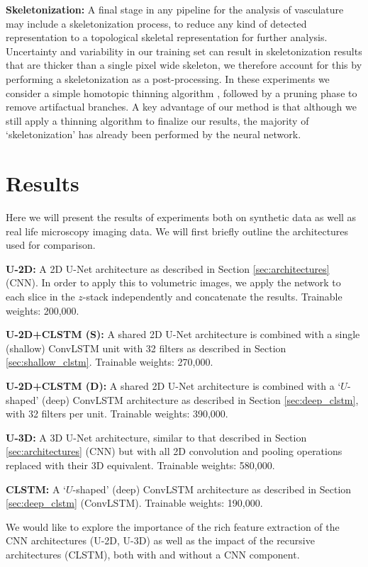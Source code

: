 \documentclass[journal,transmag]{IEEEtran}
\begin{document}
\textbf{Skeletonization: } A final stage in any pipeline for the analysis of vasculature may include a skeletonization process, to reduce any kind of detected representation to a topological skeletal representation for further analysis. Uncertainty and variability in our training set can result in skeletonization results that are thicker than a single pixel wide skeleton, we therefore account for this by performing a skeletonization as a post-processing. In these experiments we consider a simple homotopic thinning algorithm \cite{Pudney1998}, followed by a pruning phase to remove artifactual branches. A key advantage of our method is that although we still apply a thinning algorithm to finalize our results, the majority of `skeletonization' has already been performed by the neural network.

\section{Results}

Here we will present the results of experiments both on synthetic data as well as real life microscopy imaging data. We will first briefly outline the architectures used for comparison.

\textbf{U-2D: } A 2D U-Net architecture as described in Section \ref{sec:architectures} (CNN). In order to apply this to volumetric images, we apply the network to each slice in the $z$-stack independently and concatenate the results. Trainable weights: 200,000.

\textbf{U-2D+CLSTM (S): } A shared 2D U-Net architecture is combined with a single (shallow) ConvLSTM unit with 32 filters as described in Section \ref{sec:shallow_clstm}. Trainable weights: 270,000.

\textbf{U-2D+CLSTM (D): } A shared 2D U-Net architecture is combined with a `$U$-shaped' (deep) ConvLSTM architecture as described in Section \ref{sec:deep_clstm}, with 32 filters per unit. Trainable weights: 390,000.

\textbf{U-3D: } A 3D U-Net architecture, similar to that described in Section \ref{sec:architectures} (CNN) but with all 2D convolution and pooling operations replaced with their 3D equivalent. Trainable weights: 580,000.

\textbf{CLSTM: } A `$U$-shaped' (deep) ConvLSTM architecture as described in Section \ref{sec:deep_clstm} (ConvLSTM). Trainable weights: 190,000.

We would like to explore the importance of the rich feature extraction of the CNN architectures (U-2D, U-3D) as well as the impact of the recursive architectures (CLSTM), both with and without a CNN component.
\end{document}
